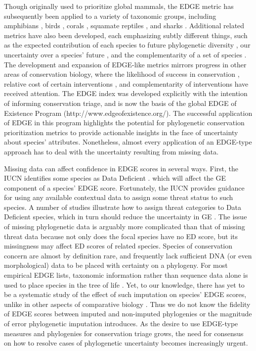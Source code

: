 \documentclass[12pt,english]{article}
\begin{document}
Though originally used to prioritize global mammals, the EDGE metric has
subsequently been applied to a variety of taxonomic groups, including amphibians
\autocite{Isaac2012}, birds \autocite{Jetz2014}, corals \autocite{Curnick2015},
squamate reptiles \autocite{Tonini2016}, and sharks \autocite{Stein2018}.
Additional related metrics have also been developed, each emphasizing subtly
different things, such as the expected contribution of each species to future
phylogenetic diversity \autocite[HEDGE, I-HEDGE;][]{Steel2007,Jensen2016}, our
uncertainty over a species' future \autocite[EDAM;][]{Pearse2015}, and the
complementarity of a set of species \autocite{Faith2008}. The development and
expansion of EDGE-like metrics mirrors progress in other areas of conservation
biology, where the likelihood of success in conservation \autocite{Wilson2007,
Mcbride2007}, relative cost of certain interventions \autocite{Naidoo2006}, and
complementarity of interventions \autocite{Pressey1993, Myers2000} have received
attention. The EDGE index was developed explicitly with the intention of
informing conservation triage, and is now the basis of the global EDGE of
Existence Program (http://www.edgeofexistence.org/). The successful application
of EDGE in this program highlights the potential for phylogenetic conservation
prioritization metrics to provide actionable insights in the face of uncertainty
about species' attributes. Nonetheless, almost every application of an EDGE-type
approach has to deal with the uncertainty resulting from missing data.

Missing data can affect confidence in EDGE scores in several ways. First, the
IUCN identifies some species as Data Deficient \autocite{Iucn2001, Iucn2008}.
which will affect the GE component of a species' EDGE score. Fortunately, the
IUCN provides guidance for using any available contextual data to assign some
threat status to such species. A number of studies illustrate how to assign
threat categories to Data Deficient species, which in turn should reduce the
uncertainty in GE \autocite{Good2006, Butchart2010, Morais2013, Dulvy2014}. The
issue of missing phylogenetic data is arguably more complicated than that of missing
threat data because not
only does the focal species have no ED score, but its missingness may affect ED scores of related species. Species of conservation concern are
almost by definition rare, and frequently lack sufficient DNA (or even
morphological) data to be placed with certainty on a phylogeny. For most
empirical EDGE lists, taxonomic information rather than sequence data alone is
used to place species in the tree of life \autocite[see][]{Isaac2007, Collen2011,
  Isaac2012, Jetz2014, Curnick2015, Stein2018, Gumbs2017}.
Yet, to our knowledge, there has yet to be a
systematic study of the effect of such imputation on species' EDGE scores,
unlike in other aspects of comparative biology \autocite{Kuhn2011, Thomas2013, Rabosky2014}.
Thus we do not know
the fidelity of EDGE scores between imputed and non-imputed phylogenies or the
magnitude of error phylogenetic imputation introduces. As the
desire to use EDGE-type measures and phylogenies for conservation triage grows,
the need for consensus on how to resolve cases of phylogenetic uncertainty
becomes increasingly urgent.
\end{document}
